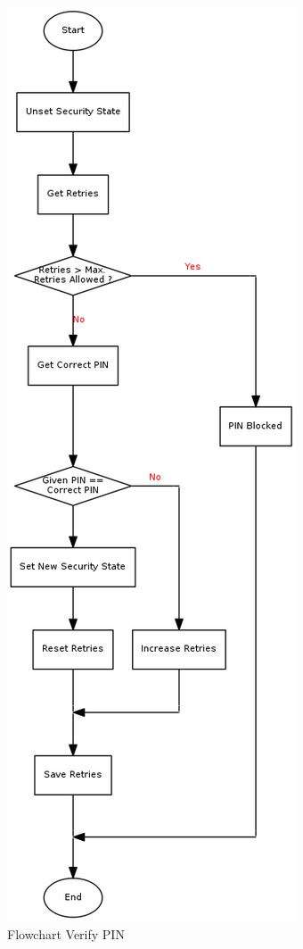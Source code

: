 \begin{figure}[!h]
\centering
\includegraphics[height=0.9\textheight]{image/state/flow_verify.png}
\caption{Flowchart Verify PIN}
\label{fig-flow-verify}
\end{figure}

